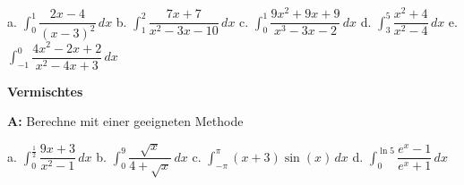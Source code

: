 \documentclass[landscape,twocolumn,a4paper]{article}
\begin{document}
a.  $\displaystyle\int_{0}^1 \dfrac{2x-4}{(x-3)^2}\, dx$ \quad
b.  $\displaystyle\int_{1}^2 \dfrac{7x+7}{x^2-3x-10}\, dx$ \quad
c.  $\displaystyle\int_{0}^1 \dfrac{9x^2+9x+9}{x^3-3x-2}\, dx$ \quad
d.  $\displaystyle\int_{3}^5 \dfrac{x^2+4}{x^2-4}\, dx$ \quad
e.  $\displaystyle\int_{-1}^0 \dfrac{4x^2-2x+2}{x^2-4x+3}\, dx$ \quad
\bigskip  {}

\textbf{Vermischtes} 
\bigskip

\textbf{A:}   
Berechne mit einer geeigneten Methode

a.  $\displaystyle\int_{0}^{\frac{1}{2}} \dfrac{9x+3}{x^2-1}\, dx$ \quad
b.  $\displaystyle\int_{0}^{9} \dfrac{\sqrt{x}}{4+\sqrt{x}}\, dx$ \quad
c.  $\displaystyle\int_{-\pi}^{\pi} (x+3)\sin(x)\, dx$ \quad
d.  $\displaystyle\int_{0}^{\ln5} \dfrac{e^x-1}{e^x+1}\, dx$ \\


\bigskip  {}
\end{document}
